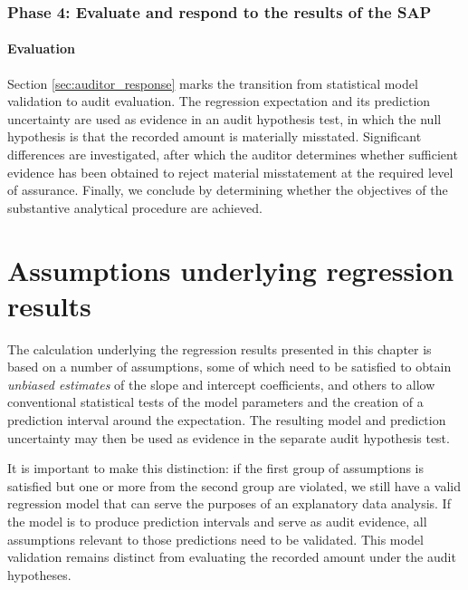 \subsubsection{Phase 4: Evaluate and respond to the results of the SAP}

\paragraph{Evaluation} %
\label{par:evaluation}

Section \ref{sec:auditor_response} marks the transition from statistical model validation to audit evaluation. The regression expectation and its prediction uncertainty are used as evidence in an audit hypothesis test, in which the null hypothesis is that the recorded amount is materially misstated. Significant differences are investigated, after which the auditor determines whether sufficient evidence has been obtained to reject material misstatement at the required level of assurance. Finally, we conclude by determining whether the objectives of the substantive analytical procedure are achieved.




\section{Assumptions underlying regression results}
\label{sec:assumptions_underlying_regression_results}

The calculation underlying the regression results presented in this chapter is based on a number of assumptions, some of which need to be satisfied to obtain \emph{unbiased estimates} of the slope and intercept coefficients, and others to allow conventional statistical tests of the model parameters and the creation of a prediction interval around the expectation. The resulting model and prediction uncertainty may then be used as evidence in the separate audit hypothesis test.

It is important to make this distinction: if the first group of assumptions is satisfied but one or more from the second group are violated, we still have a valid regression model that can serve the purposes of an explanatory data analysis. If the model is to produce prediction intervals and serve as audit evidence, all assumptions relevant to those predictions need to be validated. This model validation remains distinct from evaluating the recorded amount under the audit hypotheses.

